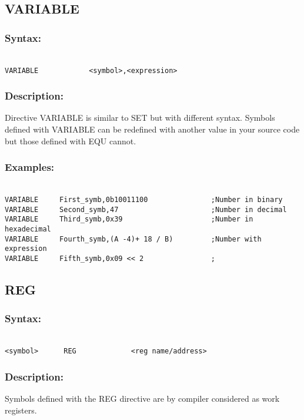     \subsection{VARIABLE}
        \subsubsection{Syntax:}
        {
            ~\\
            \usecodefont
            \verb'VARIABLE            <symbol>,<expression>'
        }
        \subsubsection{Description:}
            Directive VARIABLE is similar to SET but with different syntax. Symbols defined with VARIABLE can be redefined with another value in your source
            code but those defined with EQU cannot.

        \subsubsection{Examples:}
        {
            ~\\
            \usecodefont
            \verb'VARIABLE     First_symb,0b10011100               ;Number in binary'\\
            \verb'VARIABLE     Second_symb,47                      ;Number in decimal'\\
            \verb'VARIABLE     Third_symb,0x39                     ;Number in hexadecimal'\\
            \verb'VARIABLE     Fourth_symb,(A -4)+ 18 / B)         ;Number with expression'\\
            \verb'VARIABLE     Fifth_symb,0x09 << 2                ;'\\
        }

    \subsection{REG}
        \subsubsection{Syntax:}
        {
            ~\\
            \usecodefont
            \verb'<symbol>      REG             <reg name/address>'
        }

        \subsubsection{Description:}
        Symbols defined with the REG directive are by compiler considered as work registers.

